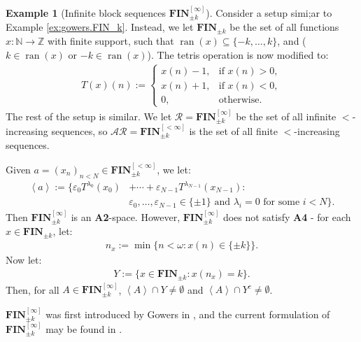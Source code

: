 \documentclass[11pt,reqno]{amsart}
\theoremstyle{plain}
\numberwithin{equation}{section}
\theoremstyle{definition}
\newtheorem{example}[theorem]{Example}
\newcommand{\func}{\operatorname}
\renewcommand{\c}[1]{\left\langle #1 \right\rangle}
\newcommand{\Z}{\mathbb{Z}}
\newcommand{\N}{\mathbb{N}}
\newcommand{\cal}{\mathcal}
\renewcommand{\bf}{\mathbf}
\newcommand{\ran}{\func{ran}}
\newcommand{\FIN}{\bf{FIN}}
\begin{document}
\begin{example}[Infinite block sequences $\FIN_{\pm k}^{[\infty]}$]
\label{ex:gowers.FIN_pmk}
    Consider a setup simi;ar to Example \ref{ex:gowers.FIN_k}. Instead, we let $\FIN_{\pm k}$ be the set of all functions $x : \N \to \Z$ with finite support, such that $\ran(x) \subseteq \{-k,\dots,k\}$, and ($k \in \ran(x)$ or $-k \in \ran(x)$). The tetris operation is now modified to:
    \begin{align*}
        T(x)(n) := 
        \begin{cases}
            x(n) - 1, &\text{if $x(n) > 0$}, \\
            x(n) + 1, &\text{if $x(n) < 0$}, \\
            0, &\text{otherwise}.
        \end{cases}
    \end{align*}
    The rest of the setup is similar. We let $\cal{R} = \FIN_{\pm k}^{[\infty]}$ be the set of all infinite $<$-increasing sequences, so $\cal{AR} = \FIN_{\pm k}^{[<\infty]}$ is the set of all finite $<$-increasing sequences.
    
    Given $a = (x_n)_{n<N} \in \FIN_{\pm k}^{[<\infty]}$, we let:
    \begin{align*}
        \c{a} := \{\varepsilon_0 T^{\lambda_0}(x_0) &+ \cdots + \varepsilon_{N-1} T^{\lambda_{N-1}}(x_{N-1}) : \\
        &\varepsilon_0,\dots,\varepsilon_{N-1} \in \{\pm 1\} \text{ and } \lambda_i = 0 \text{ for some } i < N\}.
    \end{align*}
    Then $\FIN_{\pm k}^{[\infty]}$ is an \textbf{A2}-space. However, $\FIN_{\pm k}^{[\infty]}$ does not satisfy \textbf{A4} - for each $x \in \FIN_{\pm k}$, let:
    \begin{align*}
        n_x := \min\{n < \omega : x(n) \in \{\pm k\}\}.
    \end{align*}
    Now let:
    \begin{align*}
        Y := \{x \in \FIN_{\pm k} : x(n_x) = k\}.
    \end{align*}
    Then, for all $A \in \FIN_{\pm k}^{[\infty]}$, $\c{A} \cap Y \neq \emptyset$ and $\c{A} \cap Y^c \neq \emptyset$.

    $\FIN_{\pm k}^{[\infty]}$ was first introduced by Gowers in \cite{G92}, and the current formulation of $\FIN_{\pm k}^{[\infty]}$ may be found in \cite{T10}.
\end{example}
\end{document}
